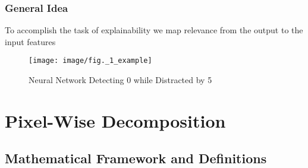 \documentclass{beamer}
\begin{document}
\iffalse

\begin{frame}
\frametitle{Interpretable Classifier} 
\vspace{0.5cm}
Explanation of non-linear classifiers\\
$\rightarrow$ A classifier should not only provide a result but also a reasoning

\begin{center}
\texttt{[image: image/cancer]}
\end{center}

We do not only need to know if the patient has cancer but also where exactly it is located

\end{frame}

\fi




\begin{frame}
\frametitle{General Idea} 
\vspace{0.5cm}
To accomplish the task of explainability we map relevance from the output to the input features

\vspace{0.25cm}

\begin{center}
\begin{figure}
\texttt{[image: image/fig.\_1\_example]}
\caption{Neural Network Detecting 0 while Distracted by 5}
\end{figure}
\end{center}

\end{frame}




\section[Pixel-Wise Decomposition]{Pixel-Wise Decomposition}

\subsection[Mathematical Framework and Definitions]{Mathematical Framework and Definitions}
\end{document}
